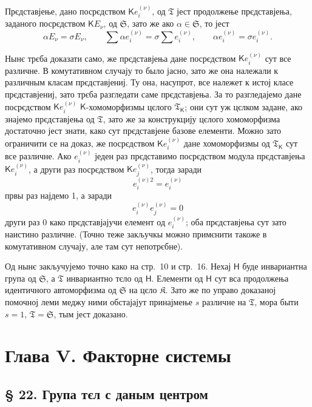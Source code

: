 \documentclass[11pt]{article}
\begin{document}
Прєдставјење, дано посрєдством \(\mathsf K e_i^{(\nu)}\), од \(\mathfrak T\) јест продолжење прєдставјења, заданого посрєдством \(\mathsf K E_\nu\), од \(\mathfrak S\), зато же ако \(\alpha\in \mathfrak S\), то јест
\[
\alpha E_\nu=\sigma E_\nu,\qquad
\sum \alpha e_i^{(\nu)}=\sigma\sum e_i^{(\nu)},\qquad
\alpha e_i^{(\nu)}=\sigma e_i^{(\nu)}.
\]

Нынє трєба доказати само, же прєдставјења дане посрєдством \(\mathsf K e_i^{(\nu)}\) сут все различне. В комутативном случају то было јасно, зато же она належали к различным класам прєдставјениј. Ту она, насупрот, все належет к истој класе прєдставјениј, зато трєба разгледати саме прєдставјења. За то разгледајемо дане посрєдством \(\mathsf K e_i^{(\nu)}\) \(\mathsf{K}\)-хомоморфизмы цєлого \(\mathfrak T_{\mathsf{K}}\); они сут уж цєлком задане, ако знајемо прєдставјења од \(\mathfrak T\), зато же за конструкцију цєлого хомоморфизма достаточно јест знати, како сут прєдставјене базове елементи. Можно зато ограничити се на доказ, же посрєдством \(\mathsf K e_i^{(\nu)}\) дане хомоморфизмы од \(\mathfrak T_{\mathsf{K}}\) сут все различне. Ако \(e_i^{(\nu)}\) једен раз прєдставимо посрєдством модула прєдставјења \(\mathsf K e_i^{(\nu)}\), а други раз посрєдством \(\mathsf K e_j^{(\nu)}\), тогда заради
\[
e_i^{(\nu)2}=e_i^{(\nu)}
\]
првы раз најдемо 1, а заради
\[
e_i^{(\nu)}e_j^{(\nu)}=0
\]
други раз 0 како прєдставјајучи елемент од \(e_i^{(\nu)}\); оба прєдставјења сут зато наистино различне. (Точно теже закључкы можно примєнити такоже в комутативном случају, але там сут непотрєбне).

Од нынє закључујемо точно како на стр.~10 и стр.~16. Нехај \(\mathsf{H}\) буде инвариантна група од \(\mathfrak S\), а \(\mathfrak T\) инвариантно тєло од \(\mathsf{H}\). Елементи од \(\mathsf{H}\) сут вса продолжења идентичного автоморфизма од \(\mathfrak S\) на цєло \(\mathfrak K\). Зато же по управо доказаној помочној леми меджу ними обстајајут принајмење \(s\) различне на \(\mathfrak T\), мора быти \(s=1\), \(\mathfrak T=\mathfrak S\), тым јест доказано.

\section*{Глава V. Факторне системы}\label{kapitel-v.-faktorensysteme}

\subsection*{§ 22. Група тєл с даным центром}\label{die-gruppe-der-koerper-mit-gegebenem-zentrum}
\end{document}
